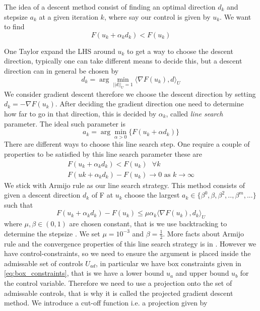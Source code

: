 The idea of a descent method consist of finding an optimal direction $d_k$ and stepsize $a_k$ at a given iteration $k$, where say our control is given by $u_k$. We want to find
\begin{equation*}
    F(u_k + \alpha_kd_k) < F(u_k)
\end{equation*}

One Taylor expand the LHS around $u_k$ to get a way to choose the descent direction, typically one can take different means to decide this, but a descent direction can in general be chosen by 
\begin{equation*}
    d_k = \arg\min_{||d||_U=1} \langle \nabla F(u_k), d \rangle_U
\end{equation*}
We consider gradient descent therefore we choose the descent direction by setting $d_k = -\nabla F(u_k)$. After deciding the gradient direction one need to determine how far to go in that direction, this is decided by $\alpha_k$, called \textit{line search} parameter. The ideal such parameter is 
\begin{equation*}
    a_k = \arg \min_{\alpha>0} \{ F(u_k + \alpha d_k) \}
\end{equation*}
There are different ways to choose this line search step. One require a couple of properties to be satisfied by this line search parameter these are
\begin{align*}
    F(u_k + \alpha_kd_k) < F(u_k) \text{  } \forall k \\
    F(uk + \alpha_k d_k) - F(u_k) \rightarrow 0 \text{ as } k\rightarrow \infty
\end{align*}
We stick with Armijo rule as our line search strategy. This method consists of given a descent direction $d_k$ of F at $u_k$ choose the largest $a_k \in \{ \beta^0, \beta, \beta^2,..,\beta^m,... \}$ such that
\begin{equation}\label{eq:armijo}
    F (u_k + \alpha_kd_k) - F(u_k) \leq \mu \alpha_k \langle \nabla F(u_k),d_k \rangle_{U}
\end{equation}
where $\mu,\beta  \in (0,1)$ are chosen constant, that is we use backtracking to determine the stepsize \cite{iterativeMethods}. We set $\mu = 10^{-3}$ and $\beta = \frac{1}{2}$. More facts about Armijo rule and the convergence properties of this line search strategy is in \cite{numMethods} \cite{iterativeMethods}. However we have control-constraints, so we need to ensure the argument is placed inside the admissable set of controls $U_{ad}$, in particular we have box constraints given in \eqref{eq:box_constraints}, that is we have a lower bound $u_a$ and upper bound $u_b$ for the control variable. Therefore we need to use a projection onto the set of admissable controls, that is why it is called the projected gradient descent method. We introduce a cut-off function i.e. a projection given by
